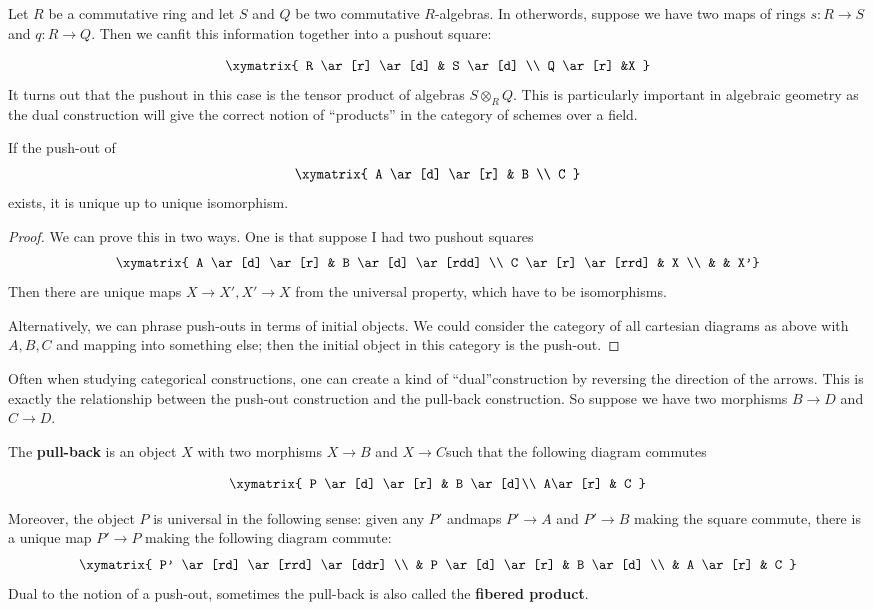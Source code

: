 \begin{example}
Let $R$ be a commutative ring and let $S$ and $Q$ be two commutative
$R$-algebras. In otherwords, suppose
we have two maps of rings $s:R\rightarrow S$ and $q:R\rightarrow Q$. Then we
canfit this information together
into a pushout square:

\[ \xymatrix{
R \ar[r] \ar[d]  &  S \ar[d]   \\
Q \ar[r] &X
}\]
It turns out that the pushout in this case is the tensor product of algebras
$S\otimes_R Q$. This is particularly important
in algebraic geometry as the dual construction will give the correct notion of
``products'' in the category of schemes over
a field.\end{example}

\begin{proposition}
If the push-out of
\[ \xymatrix{
A \ar[d] \ar[r] & B \\
C
}\]
exists, it is unique up to unique isomorphism.
\end{proposition}
\begin{proof}
We can prove this in two ways. One is that suppose I had two pushout squares
\[
\xymatrix{
A \ar[d] \ar[r] &  B \ar[d] \ar[rdd] \\
C \ar[r] \ar[rrd] &  X \\
& & X'}
\]
Then there are unique maps $X \to X', X' \to X$ from the universal property,
which have to be isomorphisms.

Alternatively, we can phrase push-outs in terms of initial objects. We could
consider the category of all cartesian diagrams as above with $A,B,C$ and
mapping into something else; then the initial
object in this category is the push-out.
\end{proof}

Often when studying categorical constructions, one can create a kind of
``dual''construction by reversing the direction of the arrows. This is exactly
the
relationship between the push-out construction and the pull-back construction.
So suppose we have two morphisms $B \to D$ and $C\to D$.
\begin{definition}
The \textbf{pull-back} is an object $X$ with two morphisms $X\to B$ and $X\to
C$such that the following diagram commutes

\[ \xymatrix {
P \ar[d] \ar[r] & B \ar[d]\\
A\ar[r] & C }\]

Moreover, the object $P$ is universal in the following sense: given any $P'$
andmaps $P'\to A$ and $P'\to B$ making the square commute, there is a
unique map
$P'\to P$ making the following diagram commute:
\[
\xymatrix{
 P' \ar[rd] \ar[rrd] \ar[ddr] \\
& P \ar[d] \ar[r] &  B \ar[d] \\
& A \ar[r] &  C }\]
Dual to the notion of a push-out, sometimes the pull-back is also called the
\textbf{fibered product}.
\end{definition}

